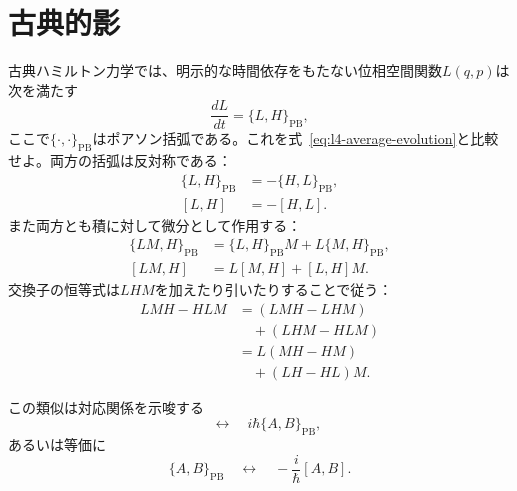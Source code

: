 \begin{classroomqa}
\end{classroomqa}

\section{古典的影}

古典ハミルトン力学では、明示的な時間依存をもたない位相空間関数\(L(q,p)\)は次を満たす
\begin{equation}
\frac{dL}{dt}=\{L,H\}_{\mathrm{PB}},
\label{eq:l4-poisson-evolution}
\end{equation}
ここで\(\{\cdot,\cdot\}_{\mathrm{PB}}\)はポアソン括弧である。これを式~\eqref{eq:l4-average-evolution}と比較せよ。両方の括弧は反対称である：
\begin{align}
\{L,H\}_{\mathrm{PB}}&=-\{H,L\}_{\mathrm{PB}},\\
[L,H]&=-[H,L].
\end{align}
また両方とも積に対して微分として作用する：
\begin{align}
\{LM,H\}_{\mathrm{PB}}
&=\{L,H\}_{\mathrm{PB}}M+L\{M,H\}_{\mathrm{PB}},\\
[LM,H]
&=L[M,H]+[L,H]M.
\label{eq:l4-commutator-product}
\end{align}
交換子の恒等式は\(LHM\)を加えたり引いたりすることで従う：
\begin{align}
LMH-HLM
&=(LMH-LHM)\\
&\quad +(LHM-HLM)\\
&=L(MH-HM)\\
&\quad +(LH-HL)M.
\end{align}

この類似は対応関係を示唆する
\begin{equation}
[A,B]
\quad\longleftrightarrow\quad
i\hbar\{A,B\}_{\mathrm{PB}},
\label{eq:l4-dirac-correspondence}
\end{equation}
あるいは等価に
\begin{equation}
\{A,B\}_{\mathrm{PB}}
\quad\longleftrightarrow\quad
-\frac{i}{\hbar}[A,B].
\end{equation}

